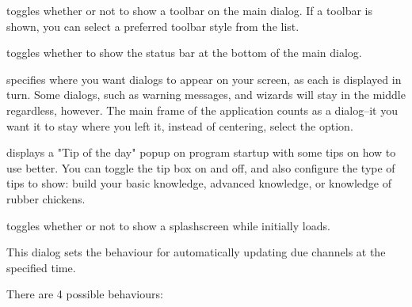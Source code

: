  toggles whether or not to show a toolbar on the 
main dialog. If a toolbar is shown, you can select a preferred toolbar style  
from the list.

 toggles whether to show the status bar at the
bottom of the main dialog.

 specifies where you want dialogs to appear 
on your screen, as each is displayed in turn. Some dialogs, such as warning 
messages, and wizards will stay in the middle regardless, however. The main 
frame of the application counts as a dialog--it you want it to stay where you 
left it, instead of centering, select the  
option.

 displays a "Tip of the day"
popup on program startup with some tips on how to use \brandingapplicationdesktopname better.
You can toggle the tip box on and off, and also configure the type of tips to
show: build your basic \brandingapplicationsuitename knowledge, advanced \brandingapplicationsuitename knowledge, or
knowledge of rubber chickens.

 toggles whether or not to show a
\brandingapplicationsuitename splashscreen while \brandingapplicationdesktopname initially loads.


This dialog sets the behaviour for automatically updating due \brandingapplicationsuitename channels 
at the specified time.

There are 4 possible behaviours:


